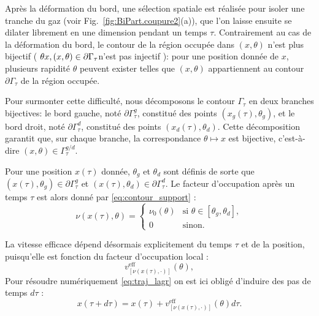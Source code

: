 Après la déformation du bord, une sélection spatiale est réalisée pour isoler une tranche du gaz (voir Fig.~\ref{fig:BiPart.coupure2}(a)), que l’on laisse ensuite se dilater librement en une dimension pendant un temps \(\tau\). Contrairement au cas de la déformation du bord, le contour de la région occupée dans $(x,\theta)$ n’est plus bijectif ( $ \theta \medskip x , (x,\theta) \in \partial \Gamma_\tau$n'est pas injectif ): pour une position donnée de $x$, plusieurs rapidité $\theta$ peuvent exister telles que $(x,\theta)$ appartiennent au contour $\partial \Gamma_\tau$ de la région occupée.

\medskip

Pour surmonter cette difficulté, nous décomposons le contour \(\Gamma_\tau\) en deux branches bijectives: le bord gauche, noté \(\partial \Gamma_\tau^g\), constitué des points \((x_g(\tau), \theta_g)\), et le bord droit, noté \(\partial \Gamma_\tau^d\), constitué des points \((x_d(\tau), \theta_d)\). Cette décomposition garantit que, sur chaque branche, la correspondance \(\theta \mapsto x\) est bijective, c’est-à-dire \((x, \theta) \in \Gamma_\tau^{g/d}\).

Pour une position \(x(\tau)\) donnée, \(\theta_g\) et \(\theta_d\) sont définis de sorte que \((x(\tau), \theta_g) \in \partial \Gamma_\tau^g\) et \((x(\tau), \theta_d) \in \partial \Gamma_\tau^d\). Le facteur d’occupation après un temps \(\tau\) est alors donné par \eqref{eq:contour_support} :
\begin{equation}
	\label{eq:contour_exp}
	\nu ( x(\tau), \theta ) = 
		\begin{cases}
			\nu_0(\theta) & \text{si } \theta \in [\theta_g, \theta_d], \\
			0 & \text{sinon}.
		\end{cases}
\end{equation}

La vitesse efficace dépend désormais explicitement du temps $\tau$ et de la position, puisqu’elle est fonction du facteur d’occupation local :
\begin{equation}
	v^{\mathrm{eff}}_{[\nu(x(\tau),\cdot)]}(\theta),
\end{equation}
Pour résoudre numériquement \eqref{eq:traj_lagr} on est ici obligé d'induire des pas de temps $d\tau$ : 
\begin{equation}\label{chap6:eq.etalement.1}
	x(\tau +d\tau ) = x(\tau ) + v^{\mathrm{eff}}_{[\nu(x(\tau),\cdot)]} (\theta)d \tau.
\end{equation}

